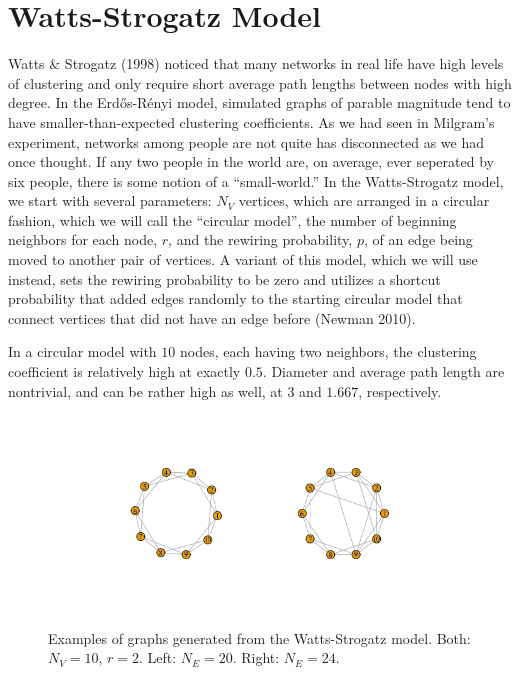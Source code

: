 \documentclass[12pt,twoside]{amherstthesis}
\begin{document}
  \section{Watts-Strogatz Model}\label{watts-strogatz-model}
  
  Watts \& Strogatz (1998) noticed that many networks in real life have
  high levels of clustering and only require short average path lengths
  between nodes with high degree. In the Erdős-Rényi model, simulated
  graphs of parable magnitude tend to have smaller-than-expected
  clustering coefficients. As we had seen in Milgram's experiment,
  networks among people are not quite has disconnected as we had once
  thought. If any two people in the world are, on average, ever seperated
  by six people, there is some notion of a ``small-world.'' In the
  Watts-Strogatz model, we start with several parameters: \(N_V\)
  vertices, which are arranged in a circular fashion, which we will call
  the ``circular model'', the number of beginning neighbors for each node,
  \(r\), and the rewiring probability, \(p\), of an edge being moved to
  another pair of vertices. A variant of this model, which we will use
  instead, sets the rewiring probability to be zero and utilizes a
  shortcut probability that added edges randomly to the starting circular
  model that connect vertices that did not have an edge before (Newman
  2010).
  
  In a circular model with \(10\) nodes, each having two neighbors, the
  clustering coefficient is relatively high at exactly \(0.5\). Diameter
  and average path length are nontrivial, and can be rather high as well,
  at \(3\) and \(1.667\), respectively.
  
  \begin{figure}[htbp]
  \centering
  \includegraphics{figure/22wattsstrogatzexample.png}
  \caption{Examples of graphs generated from the Watts-Strogatz model.
  Both: \(N_V = 10\), \(r = 2\). Left: \(N_E = 20\). Right: \(N_E = 24\).}
  \end{figure}
  
\end{document}

